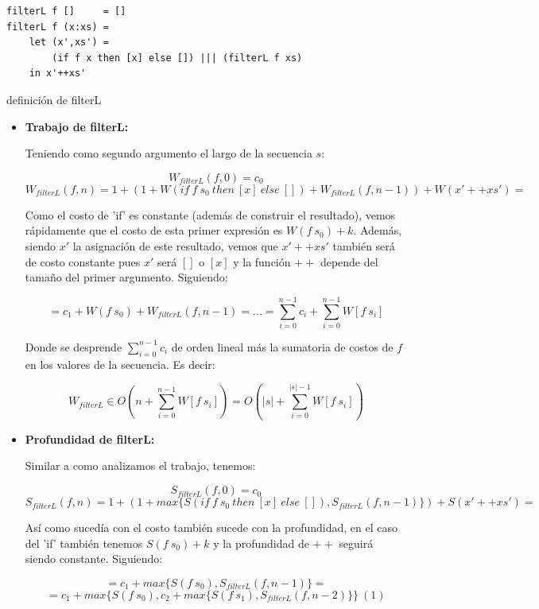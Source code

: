\documentclass[12pt]{article}
\begin{document}
\begin{table}[h]
\begin{lstlisting}
filterL f []     = []
filterL f (x:xs) = 
    let (x',xs') = 
        (if f x then [x] else []) ||| (filterL f xs) 
    in x'++xs'
\end{lstlisting}
\caption{definición de filterL}
\end{table}
\begin{itemize}

\item \textbf{Trabajo de filterL:}

    Teniendo como segundo argumento el largo de la secuencia $s$:

    $$ W_{filterL}(f, 0) = c_0 $$
    $$ W_{filterL}(f, n) = 1 + ( 1 + W(if\ f\ s_0\ then\ [x]\ else\ []) + W_{filterL}(f, n-1) ) + W(x'++xs') = $$

    Como el costo de 'if' es constante (además de construir el resultado), vemos rápidamente que el costo de esta primer expresión es $W(f\ s_0) + k$.
    Además, siendo $x'$ la asignación de este resultado, vemos que $x'++xs'$ también será de costo constante pues $x'$ será $[]$ o $[x]$ y la función $++$ depende del tamaño del primer argumento. Siguiendo:

    $$ = c_1 + W(f\ s_0) + W_{filterL}(f, n-1) = ... = \sum\limits_{i=0}^{n-1} c_i + \sum\limits_{i=0}^{n-1} W[f\ s_i] $$

    Donde se desprende $\sum\limits_{i=0}^{n-1} c_i$ de orden lineal más la sumatoria de costos de $f$ en los valores de la secuencia. Es decir:

    $$ W_{filterL} \in O(n + \sum\limits_{i=0}^{n-1} W[f\ s_i] ) = O(|s| + \sum\limits_{i=0}^{|s|-1} W[f\ s_i]) $$

\item \textbf{Profundidad de filterL:}

    Similar a como analizamos el trabajo, tenemos:

    $$ S_{filterL}(f, 0) = c_0 $$
    $$ S_{filterL}(f, n) = 1 + ( 1 + max\{ S(if\ f\ s_0\ then\ [x]\ else\ []), S_{filterL}(f, n-1)\} ) + S(x'++xs') = $$

    Así como sucedía con el costo también sucede con la profundidad, en el caso del 'if' también tenemos $S(f\ s_0) + k$ y la profundidad de $++$ seguirá siendo constante. Siguiendo:

    $$ = c_1 + max\{ S(f\ s_0), S_{filterL}(f, n-1) \} = $$
    $$ = c_1 + max\{ S(f\ s_0), c_2 + max\{S(f\ s_1), S_{filterL}(f, n-2) \} \} \ (1) $$


\end{itemize}
\end{document}
